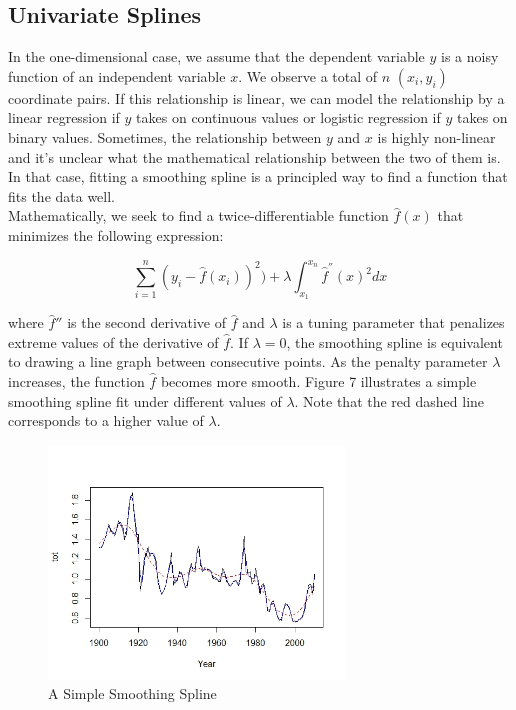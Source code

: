 \documentclass[11pt]{article}
\begin{document}
\subsection{Univariate Splines}
In the one-dimensional case, we assume that the dependent variable $y$ is a noisy function of an independent variable $x$.  We observe a total of $n$ $(x_i, y_i)$ coordinate pairs.  If this relationship is linear, we can model the relationship by a linear regression if $y$ takes on continuous values or logistic regression if $y$ takes on binary values.  Sometimes, the relationship between $y$ and $x$ is highly non-linear and it's unclear what the mathematical relationship between the two of them is.  In that case, fitting a smoothing spline is a principled way to find a function that fits the data well.\\

Mathematically, we seek to find a twice-differentiable function $\hat{f}(x)$ that minimizes the following expression:

\begin{equation}
\sum_{i = 1}^n (y_i - \hat{f}(x_i))^2) + \lambda \int_{x_1}^{x_n} \hat{f}^{''}(x)^2 dx
\end{equation}

where $\hat{f}''$ is the second derivative of $\hat{f}$ and $\lambda$ is a tuning parameter that penalizes extreme values of the derivative of $\hat{f}$.  If $\lambda = 0$, the smoothing spline is equivalent to drawing a line graph between consecutive points.  As the penalty parameter $\lambda$ increases, the function $\hat{f}$ becomes more smooth.  Figure 7 illustrates a simple smoothing spline fit under different values of $\lambda$.  Note that the red dashed line corresponds to a higher value of $\lambda$.\\

\begin{figure}[ht]
\centering
\includegraphics[width = 0.7\textwidth]{../Output/fig7.jpg}
\caption{A Simple Smoothing Spline}
\end{figure}
\end{document}
